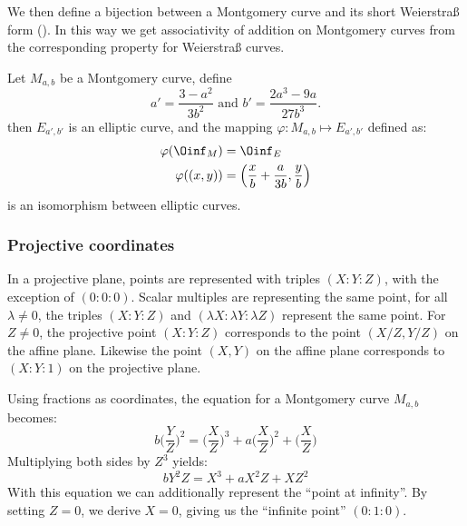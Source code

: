 We then define a bijection between a Montgomery curve and its short Weierstra{\ss} form
().
In this way we get associativity of addition on Montgomery curves from the
corresponding property for Weierstra{\ss} curves.
\begin{lemma}
  \label{lemma:bij-ecc}
  Let $M_{a,b}$ be a Montgomery curve, define
  $$a' = \frac{3-a^2}{3b^2} \text{\ \ \ \ and\ \ \ \ } b' = \frac{2a^3 - 9a}{27b^3}.$$
  then $E_{a',b'}$ is an elliptic curve, and the mapping
  $\varphi : M_{a,b} \mapsto E_{a',b'}$ defined as:
  \begin{align*}
    \varphi(\Oinf_M)   & = \Oinf_E                                                 \\
    \varphi( (x , y) ) & = \left( \frac{x}{b} + \frac{a}{3b} , \frac{y}{b} \right)
  \end{align*}
  is an isomorphism between elliptic curves.
\end{lemma}



\subsubsection{Projective coordinates}
\label{subsec:ECC-projective}

In a projective plane, points are represented with triples $(X:Y:Z)$,
with the exception of $(0:0:0)$.
Scalar multiples are representing the same point, \ie
for all $\lambda \neq 0$, the triples $(X:Y:Z)$ and $(\lambda X:\lambda Y:\lambda Z)$ represent
the same point.
For $Z\neq 0$, the projective point $(X:Y:Z)$ corresponds to the
point $(X/Z,Y/Z)$ on the affine plane. Likewise the point $(X,Y)$ on the
affine plane corresponds to $(X:Y:1)$ on the projective plane.

Using fractions as coordinates, the equation for a Montgomery curve $M_{a,b}$
becomes:
$$b \bigg(\frac{Y}{Z}\bigg)^2 = \bigg(\frac{X}{Z}\bigg)^3 + a \bigg(\frac{X}{Z}\bigg)^2 + \bigg(\frac{X}{Z}\bigg)$$
Multiplying both sides by $Z^3$ yields:
$$b Y^2Z = X^3 + a X^2Z + XZ^2$$
With this equation we can additionally represent the ``point at infinity''. By
setting $Z=0$, we derive $X=0$, giving us the ``infinite point'' $(0:1:0)$.

